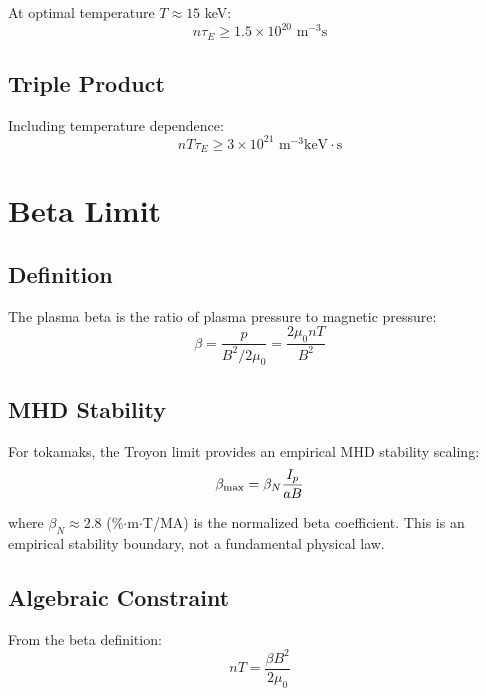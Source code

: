 \documentclass[11pt,a4paper]{article}
\begin{document}
At optimal temperature $T \approx 15$ keV:
\begin{equation}
n\tau_E \geq 1.5 \times 10^{20} \text{ m}^{-3}\text{s}
\end{equation}

\subsection{Triple Product}

Including temperature dependence:
\begin{equation}
nT\tau_E \geq 3 \times 10^{21} \text{ m}^{-3}\text{keV}\cdot\text{s}
\end{equation}

\section{Beta Limit}

\subsection{Definition}

The plasma beta is the ratio of plasma pressure to magnetic pressure:
\begin{equation}
\beta = \frac{p}{B^2/2\mu_0} = \frac{2\mu_0 nT}{B^2}
\end{equation}

\subsection{MHD Stability}

For tokamaks, the Troyon limit provides an empirical MHD stability scaling:
\begin{equation}
\beta_{\rm max} = \beta_N \frac{I_p}{aB}
\end{equation}

where $\beta_N \approx 2.8$ (\%$\cdot$m$\cdot$T/MA) is the normalized beta coefficient.
This is an empirical stability boundary, not a fundamental physical law.

\subsection{Algebraic Constraint}

From the beta definition:
\begin{equation}
nT = \frac{\beta B^2}{2\mu_0}
\end{equation}
\end{document}
